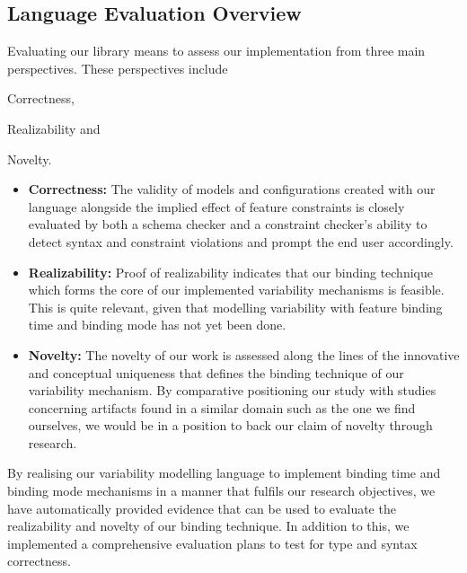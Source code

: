 \documentclass[conference]{IEEEtran}
\begin{document}
\subsection{Language Evaluation Overview}
Evaluating our library means to assess our implementation from three main perspectives. These perspectives include \begin{enumerate*}[label=(\roman*)]
\item Correctness,
\item Realizability and
\item Novelty.
\end{enumerate*}
\begin{itemize}
    \item \textbf{Correctness:} The validity of models and configurations created with our language alongside the implied effect of feature constraints is closely evaluated by both a schema checker and a constraint checker's ability to detect syntax and constraint violations and prompt the end user accordingly.
    
    \item \textbf{Realizability:} Proof of realizability indicates that our binding technique which forms the core of our implemented variability mechanisms is feasible. This is quite relevant, given that modelling variability with feature binding time and binding mode has not yet been done. 
    
    \item \textbf{Novelty:} The novelty of our work is assessed along the lines of the innovative and conceptual uniqueness that defines the binding technique of our variability mechanism. By comparative positioning our study with studies concerning artifacts found in a similar domain such as the one we find ourselves, we would be in a position to back our claim of novelty through research.
\end{itemize}

By realising our variability modelling language to implement binding time and binding mode mechanisms in a manner that fulfils our research objectives, we have automatically provided evidence that can be used to evaluate the realizability and novelty of our binding technique. In addition to this, we implemented a comprehensive evaluation plans to test for type and syntax correctness.
\end{document}
